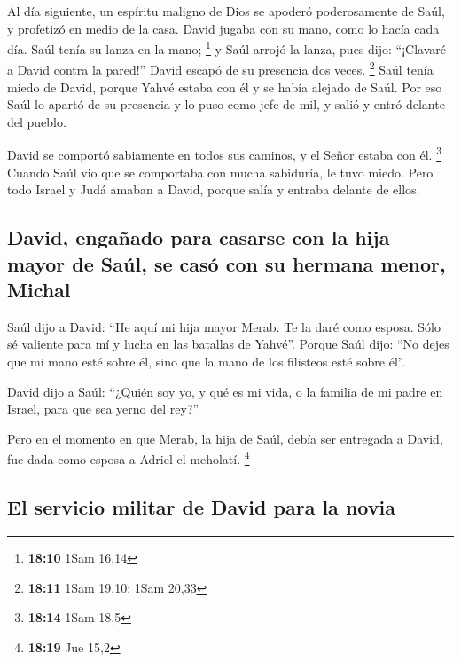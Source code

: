 \begin{paracol}{2}
 Al día siguiente, un espíritu maligno de Dios se apoderó
poderosamente de Saúl, y profetizó en medio de la casa. David jugaba con
su mano, como lo hacía cada día. Saúl tenía su lanza en la mano;
\footnote{\textbf{18:10} 1Sam 16,14}  y Saúl arrojó la
lanza, pues dijo: ``¡Clavaré a David contra la pared!'' David escapó de
su presencia dos veces. \footnote{\textbf{18:11} 1Sam 19,10; 1Sam 20,33}
 Saúl tenía miedo de David, porque Yahvé estaba con él y
se había alejado de Saúl.  Por eso Saúl lo apartó de su
presencia y lo puso como jefe de mil, y salió y entró delante del
pueblo.

 David se comportó sabiamente en todos sus caminos, y el
Señor estaba con él. \footnote{\textbf{18:14} 1Sam 18,5} 
Cuando Saúl vio que se comportaba con mucha sabiduría, le tuvo miedo.
 Pero todo Israel y Judá amaban a David, porque salía y
entraba delante de ellos.

\hypertarget{david-engauxf1ado-para-casarse-con-la-hija-mayor-de-sauxfal-se-casuxf3-con-su-hermana-menor-michal}{%
\subsection{David, engañado para casarse con la hija mayor de Saúl, se
casó con su hermana menor,
Michal}\label{david-engauxf1ado-para-casarse-con-la-hija-mayor-de-sauxfal-se-casuxf3-con-su-hermana-menor-michal}}

 Saúl dijo a David: ``He aquí mi hija mayor Merab. Te la
daré como esposa. Sólo sé valiente para mí y lucha en las batallas de
Yahvé''. Porque Saúl dijo: ``No dejes que mi mano esté sobre él, sino
que la mano de los filisteos esté sobre él''.

 David dijo a Saúl: ``¿Quién soy yo, y qué es mi vida, o
la familia de mi padre en Israel, para que sea yerno del rey?''

 Pero en el momento en que Merab, la hija de Saúl, debía
ser entregada a David, fue dada como esposa a Adriel el meholatí.
\footnote{\textbf{18:19} Jue 15,2}

\hypertarget{el-servicio-militar-de-david-para-la-novia}{%
\subsection{El servicio militar de David para la
novia}\label{el-servicio-militar-de-david-para-la-novia}}


\end{paracol}
